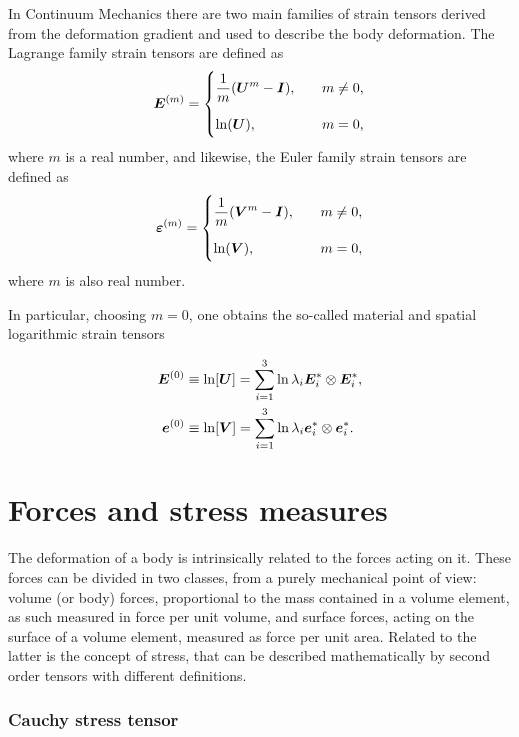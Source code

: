 In Continuum Mechanics there are two main families of strain tensors derived from the deformation gradient and used to describe the body deformation.
The Lagrange family strain tensors are defined as
\begin{equation}
    \bm{E}^{(m)} =\begin{cases} \displaystyle{\frac{1}{m} (\bm{U}^m - \bm{I})},&\quad m\neq 0,\\[12pt] \ln(\bm{U}),& \quad m=0, \end{cases}
\end{equation} where $m$ is a real number, and likewise, the Euler family strain tensors are defined as
\begin{equation}
     \bm{\varepsilon}^{(m)} =\begin{cases} \displaystyle{\frac{1}{m} (\bm{V}^m - \bm{I})},&\quad m\neq 0,\\[12pt] \ln(\bm{V}),& \quad m=0, \end{cases}
\end{equation}
where $m$ is also real number.

\enlargethispage{\baselineskip}
In particular, choosing $m=0$, one obtains the so-called material and spatial logarithmic strain tensors
\begin{highlight}[innertopmargin=-5pt]
    \begin{align}
        \bm{E}^{(0)} &\equiv \ln[\bm{U}] = \sum_{i=1}^3 \ln \lambda_i \bm{E}_i^*\otimes \bm{E}_i^*,\\
        \bm{e}^{(0)} &\equiv \ln [\bm{V}] = \sum_{i=1}^3 \ln \lambda_i \bm{e}_i^*\otimes \bm{e}_i^*.
    \end{align}
\end{highlight}


\section{Forces and stress measures}

The deformation of a body is intrinsically related to the forces acting on it.
These forces can be divided in two classes, from a purely mechanical point of view: volume (or body) forces, proportional to the mass contained in a volume element, as such measured in force per unit volume, and surface forces, acting on the surface of a volume element, measured as force per unit area.
Related to the latter is the concept of stress, that can be described mathematically by second order tensors with different definitions.

\subsubsection{Cauchy stress tensor}

